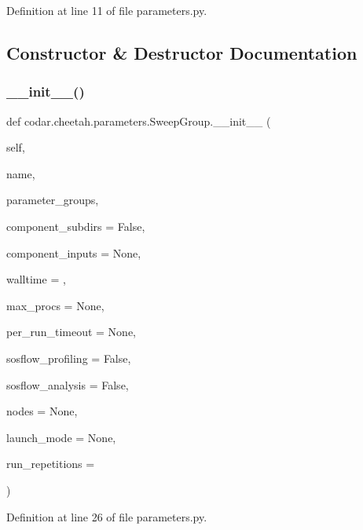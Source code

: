 Definition at line 11 of file parameters.\+py.



\subsection{Constructor \& Destructor Documentation}
\mbox{\label{classcodar_1_1cheetah_1_1parameters_1_1_sweep_group_ac736891b570edfa88bd8391ac82232c0}} 
\subsubsection{\texorpdfstring{\+\_\+\+\_\+init\+\_\+\+\_\+()}{\_\_init\_\_()}}
{\footnotesize\ttfamily def codar.\+cheetah.\+parameters.\+Sweep\+Group.\+\_\+\+\_\+init\+\_\+\+\_\+ (\begin{DoxyParamCaption}\item[{}]{self,  }\item[{}]{name,  }\item[{}]{parameter\+\_\+groups,  }\item[{}]{component\+\_\+subdirs = {\ttfamily False},  }\item[{}]{component\+\_\+inputs = {\ttfamily None},  }\item[{}]{walltime = {},  }\item[{}]{max\+\_\+procs = {\ttfamily None},  }\item[{}]{per\+\_\+run\+\_\+timeout = {\ttfamily None},  }\item[{}]{sosflow\+\_\+profiling = {\ttfamily False},  }\item[{}]{sosflow\+\_\+analysis = {\ttfamily False},  }\item[{}]{nodes = {\ttfamily None},  }\item[{}]{launch\+\_\+mode = {\ttfamily None},  }\item[{}]{run\+\_\+repetitions = {} }\end{DoxyParamCaption})}



Definition at line 26 of file parameters.\+py.



